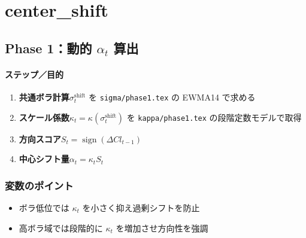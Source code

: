 
\section*{center\_shift}\nopagebreak[4]

\subsection*{Phase 1：動的 $\alpha_t$ 算出}\nopagebreak[4]
\paragraph{ステップ／目的}
\begin{flushleft}
\begin{enumerate}
  \item \textbf{共通ボラ計算}\;\(\sigma_t^{\text{shift}}\) を
        {\scriptsize\verb|sigma/phase1.tex|} の EWMA14 で求める
  \item \textbf{スケール係数}\;\(\kappa_t=\kappa(\sigma_t^{\text{shift}})\) を
        {\scriptsize\verb|kappa/phase1.tex|} の段階定数モデルで取得
  \item \textbf{方向スコア}\;\(S_t=\operatorname{sign}(\Delta Cl_{t-1})\)
  \item \textbf{中心シフト量}\;\(\alpha_t=\kappa_t S_t\)
\end{enumerate}
\end{flushleft}

\subsubsection*{変数のポイント}
\begin{flushleft}
\begin{itemize}
  \item ボラ低位では \(\kappa_t\) を小さく抑え過剰シフトを防止
  \item 高ボラ域では段階的に \(\kappa_t\) を増加させ方向性を強調
\end{itemize}
\end{flushleft}

